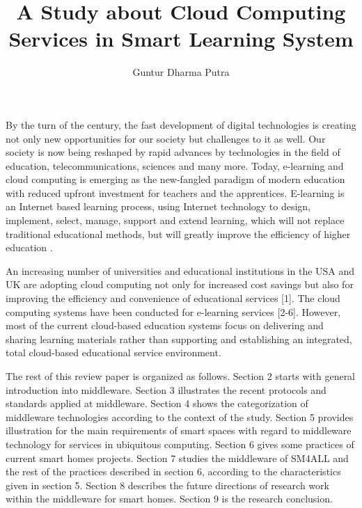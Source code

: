 \documentclass[journal]{vgtc}                %
\title{A Study about Cloud Computing Services in Smart Learning System}
\author{Guntur Dharma Putra}
\begin{document}

\maketitle

By the turn of the century, the fast development of digital technologies is creating not only new opportunities for our society but challenges to it as well. Our society is now being reshaped by rapid advances by technologies in the field of education, telecommunications, sciences and many more. Today, e-learning and cloud computing is emerging as the new-fangled paradigm of modern education with reduced upfront investment for teachers and the apprentices. E-learning is an Internet based learning process, using Internet technology to design, implement, select, manage, support and extend learning, which will not replace traditional educational methods, but will greatly improve the efficiency of higher education \cite{SudhirKumarSharmaNidhiGoyal2014}.

An increasing number of universities and educational institutions in the USA and UK are adopting cloud computing not only for increased cost savings but also for improving the efficiency and convenience of educational services [1]. The cloud computing systems have been conducted for e-learning services [2-6]. However, most of the current cloud-based education systems focus on delivering and sharing learning materials rather than supporting and establishing an integrated, total cloud-based educational service environment.

The rest of this review paper is organized as follows. Section 2 starts with general introduction into middleware. Section 3 illustrates the recent protocols and standards applied at middleware. Section 4 shows the categorization of middleware technologies according to the context of the study. Section 5 provides illustration for the main requirements of smart spaces with regard to middleware technology for services in ubiquitous computing. Section 6 gives some practices of current smart homes projects. Section 7 studies the middleware of SM4ALL and the rest of the practices described in section 6, according to the characteristics given in section 5. Section 8 describes the future directions of research work within the middleware for smart homes. Section 9 is the research conclusion.
\end{document}
